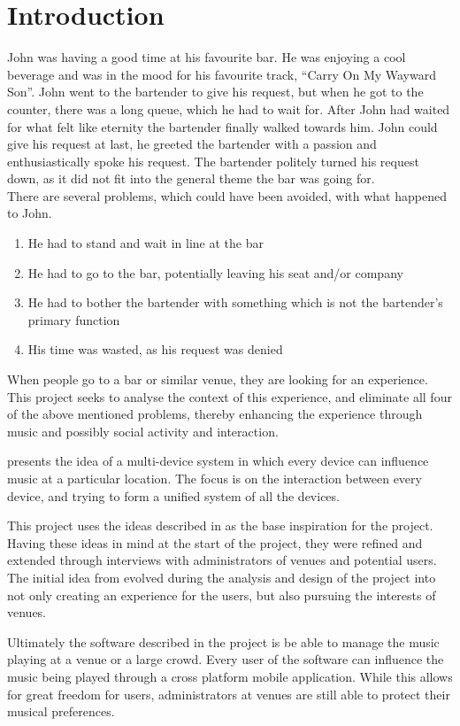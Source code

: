 \chapter{Introduction}\label{introduction} John was having a good time
at his favourite bar. He was enjoying a cool beverage and was in the
mood for his favourite track, \enquote{Carry On My Wayward Son}. John
went to the bartender to give his request, but when he got to the
counter, there was a long queue, which he had to wait for. After John
had waited for what felt like eternity the bartender finally walked
towards him. John could give his request at last, he greeted the
bartender with a passion and enthusiastically spoke his request. The
bartender politely turned his request down, as it did not fit into the
general theme the bar was going for.\\

There are several problems, which could have been avoided, with what
happened to John.
\begin{enumerate}
	\item He had to stand and wait in line at the bar
	\item He had to go to the bar, potentially leaving his seat and/or
company
	\item He had to bother the bartender with something which is
not the bartender's primary function
	\item His time was wasted, as his request was denied
\end{enumerate}

When people go to a bar or similar venue, they are looking for an
experience. This project seeks to analyse the context of this
experience, and eliminate all four of the above mentioned problems,
thereby enhancing the experience through music and possibly social
activity and interaction.

\cite{sorensen2012} presents the idea of a multi-device system in
which every device can influence music at a particular location. The
focus is on the interaction between every device, and trying to form a
unified system of all the devices.

This project uses the ideas described in \cite{sorensen2012} as the
base inspiration for the project. Having these ideas in mind at the start of the
project, they were refined and extended through interviews with
administrators of venues and potential users. The initial idea from
\cite{sorensen2012} evolved during the analysis and design of the
project into not only creating an experience for the users, but also
pursuing the interests of venues.

Ultimately the software described in the project is be able to manage
the music playing at a venue or a large crowd. Every user of the
software can influence the music being played through a cross platform
mobile application. While this allows for great freedom for users,
administrators at venues are still able to protect their musical
preferences.

